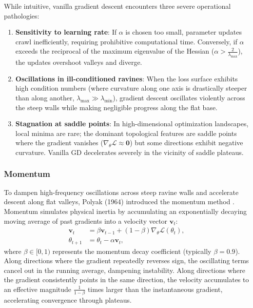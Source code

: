 \documentclass[../../main.tex]{subfiles}
\begin{document}
While intuitive, vanilla gradient descent encounters three severe operational pathologies:
\begin{enumerate}[label=(\roman*)]
    \item \textbf{Sensitivity to learning rate}: If $\alpha$ is chosen too small, parameter updates crawl inefficiently, requiring prohibitive computational time. Conversely, if $\alpha$ exceeds the reciprocal of the maximum eigenvalue of the Hessian ($\alpha > \frac{2}{\lambda_{\max}}$), the updates overshoot valleys and diverge.
    \item \textbf{Oscillations in ill-conditioned ravines}: When the loss surface exhibits high condition numbers (where curvature along one axis is drastically steeper than along another, $\lambda_{\max} \gg \lambda_{\min}$), gradient descent oscillates violently across the steep walls while making negligible progress along the flat base.
    \item \textbf{Stagnation at saddle points}: In high-dimensional optimization landscapes, local minima are rare; the dominant topological features are saddle points where the gradient vanishes ($\nabla_\theta \mathcal{L} \approx \mathbf{0}$) but some directions exhibit negative curvature. Vanilla GD decelerates severely in the vicinity of saddle plateaus.
\end{enumerate}

\subsubsection{Momentum}

To dampen high-frequency oscillations across steep ravine walls and accelerate descent along flat valleys, Polyak (1964) introduced the momentum method \citep{goodfellow2016}. Momentum simulates physical inertia by accumulating an exponentially decaying moving average of past gradients into a velocity vector $\mathbf{v}_t$:
\begin{align}
\mathbf{v}_t &= \beta \mathbf{v}_{t-1} + (1 - \beta) \nabla_\theta \mathcal{L}(\theta_t), \label{eq:momentum_velocity} \\
\theta_{t+1} &= \theta_t - \alpha \mathbf{v}_t, \label{eq:momentum_update}
\end{align}
where $\beta \in [0, 1)$ represents the momentum decay coefficient (typically $\beta = 0.9$). Along directions where the gradient repeatedly reverses sign, the oscillating terms cancel out in the running average, dampening instability. Along directions where the gradient consistently points in the same direction, the velocity accumulates to an effective magnitude $\frac{1}{1 - \beta}$ times larger than the instantaneous gradient, accelerating convergence through plateaus.
\end{document}
